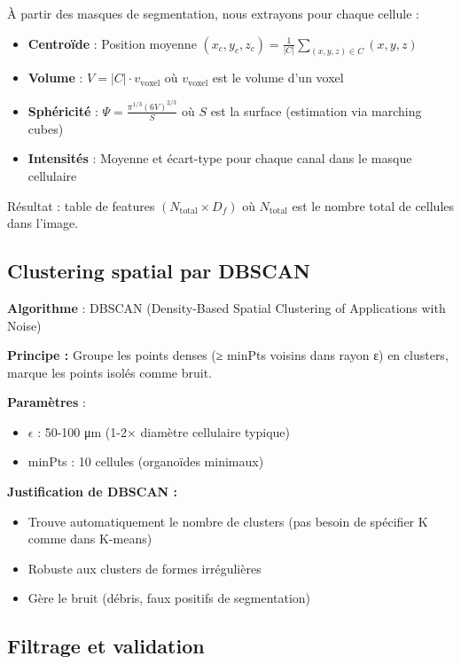 À partir des masques de segmentation, nous extrayons pour chaque cellule :
\begin{itemize}
    \item \textbf{Centroïde} : Position moyenne $(x_c, y_c, z_c) = \frac{1}{|C|}\sum_{(x,y,z) \in C} (x,y,z)$
    \item \textbf{Volume} : $V = |C| \cdot v_{\text{voxel}}$ où $v_{\text{voxel}}$ est le volume d'un voxel
    \item \textbf{Sphéricité} : $\Psi = \frac{\pi^{1/3}(6V)^{2/3}}{S}$ où $S$ est la surface (estimation via marching cubes)
    \item \textbf{Intensités} : Moyenne et écart-type pour chaque canal dans le masque cellulaire
\end{itemize}

Résultat : table de features $(N_{\text{total}} \times D_f)$ où $N_{\text{total}}$ est le nombre total de cellules dans l'image.

\subsection{Clustering spatial par DBSCAN}

\textbf{Algorithme} : DBSCAN (Density-Based Spatial Clustering of Applications with Noise)

\textbf{Principe :}
Groupe les points denses (≥ minPts voisins dans rayon ε) en clusters, marque les points isolés comme bruit.

\textbf{Paramètres} :
\begin{itemize}
    \item $\epsilon$ : 50-100 μm (1-2× diamètre cellulaire typique)
    \item minPts : 10 cellules (organoïdes minimaux)
\end{itemize}

\textbf{Justification de DBSCAN :}
\begin{itemize}
    \item Trouve automatiquement le nombre de clusters (pas besoin de spécifier K comme dans K-means)
    \item Robuste aux clusters de formes irrégulières
    \item Gère le bruit (débris, faux positifs de segmentation)
\end{itemize}

\subsection{Filtrage et validation}

